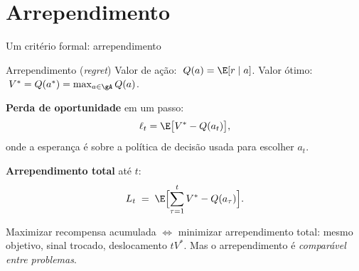 \documentclass[aspectratio=169, 10pt]{beamer}
\newcommand{\Reg}{L}
\begin{document}
\section{Arrependimento}

\begin{frame}{Um critério formal: arrependimento}
  \begin{defbox}{Arrependimento (\emph{regret})}
    Valor de ação: $\;Q(a) = \E[r \mid a]$. \quad
    Valor ótimo: $\;V^{*} = Q(a^{*}) = \max_{a \in \gA} Q(a)$.
    \smallskip

    \textbf{Perda de oportunidade} em um passo:
    \[ \ell_t = \E\bigl[V^{*} - Q(a_t)\bigr], \]
    onde a esperança é sobre a política de decisão usada para escolher $a_t$.
    \smallskip

    \textbf{Arrependimento total} até $t$:
    \[
      \Reg_t \;=\; \E\Bigl[\sum_{\tau=1}^{t} V^{*} - Q(a_\tau)\Bigr].
    \]
  \end{defbox}

  \begin{ideiabox}
    Maximizar recompensa acumulada $\iff$ minimizar arrependimento total:
    mesmo objetivo, sinal trocado, deslocamento $tV^{*}$. Mas o
    arrependimento é \emph{comparável entre problemas}.
  \end{ideiabox}
\end{frame}
\end{document}
